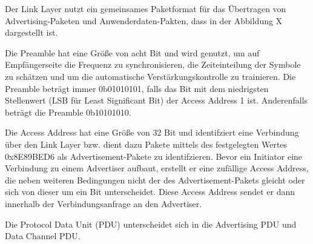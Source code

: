 Der Link Layer nutzt ein gemeinsames Paketformat für das Übertragen von Advertising-Paketen und Anwenderdaten-Pakten, dass in der Abbildung X
dargestellt ist.

Die Preamble hat eine Größe von acht Bit und wird genutzt, um auf Empfängerseite die Frequenz zu synchronisieren, die Zeiteinteilung der Symbole zu schätzen und um die automatische Verstärkungskontrolle zu trainieren. Die Preamble beträgt immer 0b01010101, falls das Bit mit dem niedrigsten Stellenwert (LSB für Least Significant Bit) der Access Address 1 ist. Anderenfalls beträgt die Preamble 0b10101010.

Die Access Address hat eine Größe von 32 Bit und identifziert eine Verbindung über den Link Layer bzw. dient dazu Pakete mittels des festgelegten Wertes 0x8E89BED6 als Advertisement-Pakete zu identifzieren. Bevor ein Initiator eine Verbindung zu einem Advertiser aufbaut, erstellt er eine zufällige Access Address, die neben weiteren Bedingungen nicht der des Advertisement-Pakets gleicht oder sich von dieser um ein Bit unterscheidet. Diese Access Address sendet er dann innerhalb der Verbindungsanfrage an den Advertiser.

Die Protocol Data Unit (PDU) unterscheidet sich in die Advertising PDU und Data Channel PDU.

